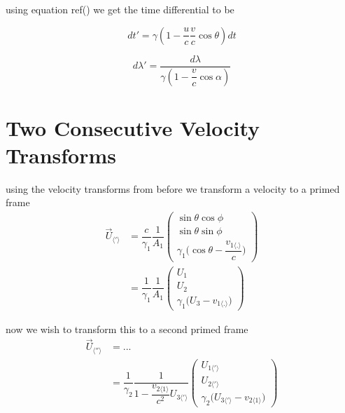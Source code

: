 using equation ref() we get the time differential to be

\begin{equation}
	dt' = \gamma \left( 1 - \dfrac{u}{c}\dfrac{v}{c}\cos\theta \right) dt
\end{equation}

\begin{equation}
	d\lambda' = \dfrac{ d\lambda }{ \gamma \left(1-\dfrac{v}{c}\cos\alpha \right)}
\end{equation}



\chapter{Two Consecutive Velocity Transforms}
using the velocity transforms from before we transform a velocity to a primed frame
\begin{equation}%
    \begin{aligned}
    \vec{U}_{\langle ' \rangle}
    &= \dfrac{c}{\gamma_1} \dfrac{1}{A_1} \begin{pmatrix}
    \sin\theta\cos\phi\\ \sin\theta\sin\phi\\ \gamma_1\Big(\cos\theta - \dfrac{v_{1\langle . \rangle}}{c}\Big)
    \end{pmatrix} \\
    &= \dfrac{1}{\gamma_1} \dfrac{1}{A_1} \begin{pmatrix}
    U_1\\ U_2\\ \gamma_1\Big(U_3 - v_{1\langle . \rangle}\Big)
    \end{pmatrix}
    \end{aligned}
\end{equation}%

now we wish to transform this to a second primed frame
\begin{equation}%
    \begin{aligned}
    \vec{U}_{\langle '' \rangle}
    &= ... \\
    &= \dfrac{1}{\gamma_2} \dfrac{1}{1-\dfrac{v_{2\langle 1 \rangle}}{c^2}U_{3\langle'\rangle}} \begin{pmatrix}
    U_{1\langle'\rangle}\\ U_{2\langle'\rangle}\\ \gamma_2\Big(U_{3\langle'\rangle} - v_{2\langle 1 \rangle} \Big)
    \end{pmatrix}
    \end{aligned}
\end{equation}%

